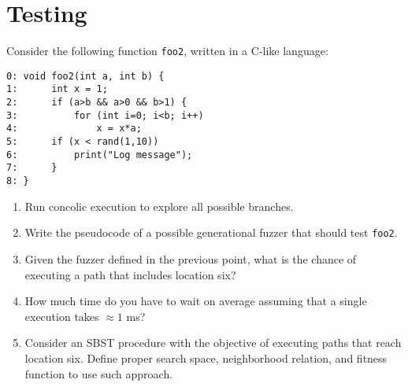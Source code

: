 \section{Testing}

Consider the following function \texttt{foo2}, written in a C-like language:
\begin{lstlisting}[style=C]
0: void foo2(int a, int b) {
1:      int x = 1;
2:      if (a>b && a>0 && b>1) {
3:          for (int i=0; i<b; i++)
4:              x = x*a;
5:      if (x < rand(1,10))
6:          print("Log message");
7:      } 
8: }
\end{lstlisting}
\begin{enumerate}
    \item Run concolic execution to explore all possible branches. 
    \item Write the pseudocode of a possible generational fuzzer that should test \texttt{foo2}.
    \item Given the fuzzer defined in the previous point, what is the chance of executing a path that includes location six?
    \item How much time do you have to wait on average assuming that a single execution takes $\approx 1$ ms?
    \item Consider an SBST procedure with the objective of executing paths that reach location six. 
        Define proper search space, neighborhood relation, and fitness function to use such approach. 
\end{enumerate}

